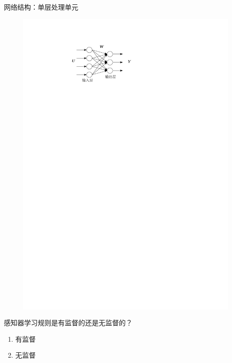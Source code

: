 \begin{note}
    网络结构：单层处理单元
    \begin{figure}[htbp]
        \centering
        \includegraphics[scale = 0.9]{image/单层处理单元.pdf}
    \end{figure}
\end{note}

\begin{example}
    感知器学习规则是有监督的还是无监督的？
    \begin{enumerate}[A]
        \item \textcolor{main1}{有监督}
        \item 无监督
    \end{enumerate}
\end{example}

